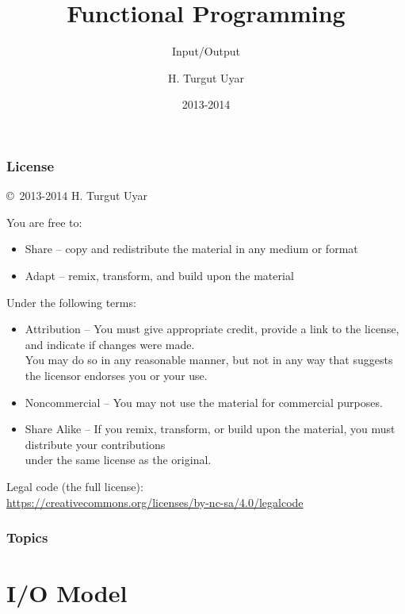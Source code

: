 \documentclass[dvipsnames]{beamer}
\title{Functional Programming}
\subtitle{Input/Output}
\author{H. Turgut Uyar}
\date{2013-2014}
\theoremstyle{plain}
\begin{document}

\begin{frame}
  \titlepage
\end{frame}

\begin{frame}
  \frametitle{License}

  \hfill
  \copyright~2013-2014 H. Turgut Uyar

  \vfill
  \begin{tiny}
    You are free to:
    \begin{itemize}
      \item Share -- copy and redistribute the material in any medium or format
      \item Adapt -- remix, transform, and build upon the material
    \end{itemize}

    Under the following terms:
    \begin{itemize}
      \item Attribution -- You must give appropriate credit, provide a link to
        the license, and indicate if changes were made.\\
        You may do so in any reasonable manner, but not in any way
        that suggests the licensor endorses you or your use.

      \item Noncommercial -- You may not use the material for commercial
        purposes.

      \item Share Alike -- If you remix, transform, or build upon the material,
        you must distribute your contributions\\
        under the same license as the original.
    \end{itemize}
  \end{tiny}

  \vfill
  \begin{small}
    Legal code (the full license):\\
    \url{https://creativecommons.org/licenses/by-nc-sa/4.0/legalcode}
  \end{small}
\end{frame}

\begin{frame}
  \frametitle{Topics}
  \tableofcontents
\end{frame}

\section{I/O Model}
\end{document}

